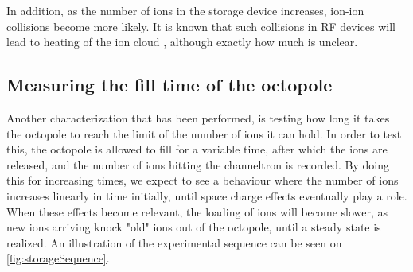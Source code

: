 In addition, as the number of ions in the storage device increases, ion-ion collisions become more likely. It is known that such collisions in RF devices will lead to heating of the ion cloud \cite{BlumelHeating,MichaelIonIonHeating}, although exactly how much is unclear.


\subsection{Measuring the fill time of the octopole}
Another characterization that has been performed, is testing how long it takes the octopole to reach the limit of the number of ions it can hold.
In order to test this, the octopole is allowed to fill for a variable time, after which the ions are released, and the number of ions hitting the channeltron is recorded.
By doing this for increasing times, we expect to see a behaviour where the number of ions increases linearly in time initially, until space charge effects  eventually play a role.
When these effects become relevant, the loading of ions will become slower, as new ions arriving knock "old" ions out of the octopole, until a steady state is realized.
An illustration of the experimental sequence can be seen on \cref{fig:storageSequence}. 

